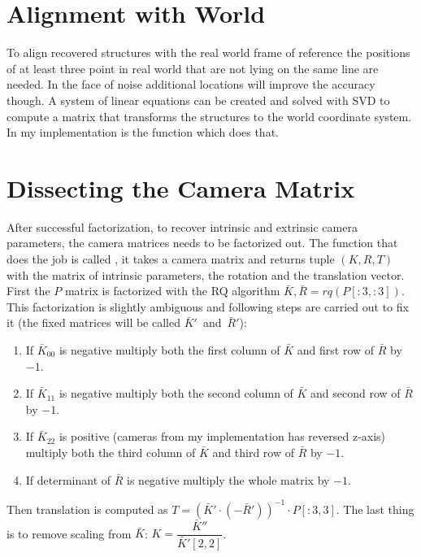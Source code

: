 \documentclass[12pt]{article}
\begin{document}
\section{Alignment with World}

To align recovered structures with the real world frame of reference the
positions of at least three point in real world that are not lying on the same line
are needed. In the face of noise additional locations will improve the accuracy
though. A system of linear equations can be created and solved with SVD to
compute a matrix that transforms the structures to the world coordinate system.
In my implementation  is the function which
does that.

\newpage

\section{Dissecting the Camera Matrix}

After successful factorization, to recover intrinsic and extrinsic camera
parameters, the camera matrices needs to be factorized out. The function that
does the job is called , it takes a camera matrix and returns
tuple $(K, R, T)$ with the matrix of intrinsic parameters, the rotation and the translation
vector. First the $P$ matrix is factorized with the RQ algorithm $\bar{K},
\bar{R} = rq(P[:3, :3])$. This factorization is slightly ambiguous and following
steps \cite{simek12} are carried out to fix it (the fixed matrices will be called $\bar{K}'$~and~$\bar{R}'$):

\begin{enumerate}
\item If $\bar{K}_{00}$ is negative multiply both the first column of $\bar{K}$ and first row
of $\bar{R}$ by $-1$.
\item If $\bar{K}_{11}$ is negative multiply both the second column of $\bar{K}$ and second row
of $\bar{R}$ by $-1$.
\item If $\bar{K}_{22}$ is positive (cameras from my implementation has reversed z-axis)
multiply both the third column of $\bar{K}$ and third row of $\bar{R}$ by $-1$.
\item If determinant of $\bar{R}$ is negative multiply the whole matrix by $-1$.
\end{enumerate}

Then translation is computed as $T = (\bar{K}' \cdot (-\bar{R}'))^{-1} \cdot
P[:3, 3]$. The  last thing is to remove scaling from $\bar{K}$: $K =
\dfrac{\bar{K}''}{\bar{K}'[2,2]}$.
\end{document}
